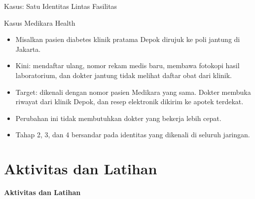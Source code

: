 \documentclass[aspectratio=169, table, 12pt]{beamer}
\begin{document}
\begin{frame}{{\Large Kasus: Satu Identitas Lintas Fasilitas}}
  \begin{block}{Kasus Medikara Health}
    \small
    \begin{itemize}
      \item Misalkan pasien diabetes klinik pratama Depok dirujuk ke poli jantung di Jakarta.
      \item Kini: mendaftar ulang, nomor rekam medis baru, membawa fotokopi hasil laboratorium, dan dokter
            jantung tidak melihat daftar obat dari klinik.
      \item Target: dikenali dengan nomor pasien Medikara yang sama. Dokter membuka riwayat dari klinik
            Depok, dan resep elektronik dikirim ke apotek terdekat.
      \item Perubahan ini tidak membutuhkan dokter yang bekerja lebih cepat.
      \item Tahap 2, 3, dan 4 bersandar pada identitas yang dikenali di seluruh jaringan.
    \end{itemize}
  \end{block}
\end{frame}

\section{Aktivitas dan Latihan}

\begin{frame}{\hfill}
  \centering
  \Huge{\textbf{Aktivitas dan Latihan}}
\end{frame}
\end{document}

